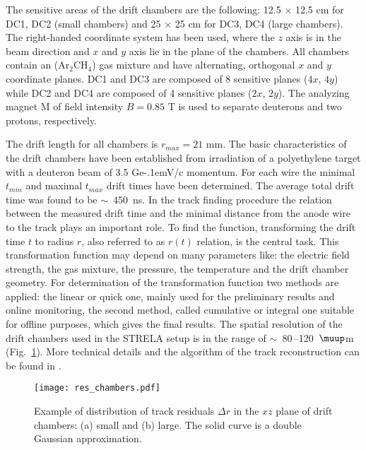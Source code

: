\documentclass[twocolumn,epjc3]{svjour3}
\newcommand{\GeVc}   {Ge\kern-.1emV/c\xspace}
\begin{document}
The sensitive areas of the drift chambers are the following: 12.5 $\times$ 12.5
cm for DC1, DC2 (small chambers) and 25 $\times$ 25 cm for DC3, DC4 (large
chambers). The right-handed coordinate system has been used, where the $z$ axis
is in the beam direction and $x$ and $y$ axis lie in the plane of the
chambers. All chambers contain an (Ar$_2$CH$_4$) gas mixture and have
alternating, orthogonal $x$ and $y$ coordinate planes. DC1 and DC3 are composed
of 8 sensitive planes ($4x$, $4y$) while DC2 and DC4 are composed of 4 sensitive
planes ($2x$, $2y$). The analyzing magnet M of field intensity $B = 0.85$ T is
used to separate deuterons and two protons, respectively.

The drift length for all chambers is $r_{max} = 21$ mm. The basic
characteristics of the drift chambers have been established from irradiation of
a polyethylene target with a deuteron beam of 3.5 \GeVc momentum. For each wire
the minimal $t_{min}$ and maximal $t_{max}$ drift times have been
determined. The average total drift time was found to be $\sim$~450~ns. In the
track finding procedure the relation between the measured drift time and the
minimal distance from the anode wire to the track plays an important role. To
find the function, transforming the drift time $t$ to radius $r$, also referred
to as $r(t)$ relation, is the central task. This transformation function may
depend on many parameters like: the electric field strength, the gas mixture,
the pressure, the temperature and the drift chamber geometry. For determination
of the transformation function two methods are applied: the linear or quick one,
mainly used for the preliminary results and online monitoring, the second
method, called cumulative or integral one suitable for offline purposes, which
gives the final results. The spatial resolution of the drift chambers used in
the STRELA setup is in the range of $\sim$~80\,--120~$\muup$m
(Fig.~\ref{fig:res_chambers}). More technical details and the algorithm of the
track reconstruction can be found in \cite{gla13}.

\begin{figure}[h]
  \centering
  \texttt{[image: res\_chambers.pdf]}
  \caption{Example of distribution of track residuals $\Delta r$ in the $xz$
    plane of drift chambers: (a) small and (b) large. The solid curve is a
    double Gaussian approximation.}
  \label{fig:res_chambers}
\end{figure}
\end{document}
